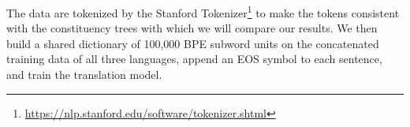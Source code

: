 \documentclass[11pt,a4paper]{article}
\newcommand\ie{i.e.\ }
\newcommand\footurl[1]{\footnote{\url{#1}}}
\def\RR#1{{\color{blue}RR: \it #1}}
\def\JL#1{{\color{magenta}JL: \it #1}}
\def\JL#1{}
\def\RR#1{}
\begin{document}
The data are
tokenized by the Stanford Tokenizer\footurl{https://nlp.stanford.edu/software/tokenizer.shtml}
to make the tokens
consistent with the constituency trees with which we
will
compare our results.
We then build a shared dictionary of 100,000 BPE subword units
\cite{bpe} on the concatenated training data of all three languages,
append an
EOS symbol to
each sentence, and train the translation model.





\end{document}
